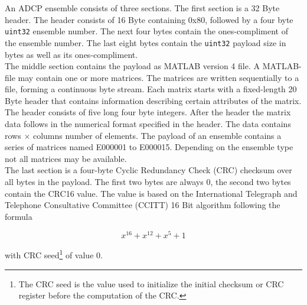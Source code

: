 An ADCP ensemble consists of three sections. The first section is a 32 Byte header. The header consists of 16 Byte containing 0x80, followed by a four byte \texttt{uint32} ensemble number. The next four bytes contain the ones-compliment of the ensemble number. The last eight bytes contain the \texttt{uint32} payload size in bytes as well as its ones-compliment.\\
The middle section contains the payload as MATLAB version 4 file. A MATLAB-file may contain one or more matrices. The matrices are written sequentially to a file, forming a continuous byte stream. Each matrix starts with a fixed-length 20 Byte header that contains information describing certain attributes of the matrix. The header consists of five long four byte integers. After the header the matrix data follows in the numerical format specified in the header. The data contains rows $\times$ columns number of elements.
The payload of an ensemble contains a series of matrices named E000001 to E000015. Depending on the ensemble type not all matrices may be available.\\
The last section is a four-byte Cyclic Redundancy Check (CRC) checksum over all bytes in the payload. The first two bytes are always 0, the second two bytes contain the CRC16 value. The value is based on the International Telegraph and Telephone Consultative Committee (CCITT) 16 Bit algorithm following the formula 

$$ x^{16} + x^{12} + x^5 +1$$

with CRC seed\footnote{\label{foot:3} The CRC seed is the value used to initialize the initial checksum or CRC register before the computation of the CRC.} of value 0.

